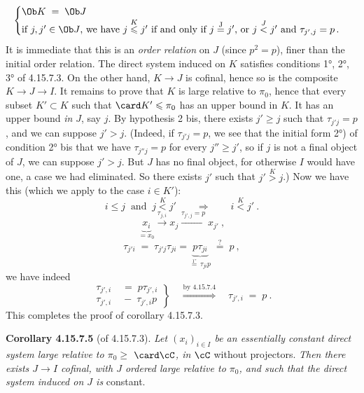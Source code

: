 \[
\begin{cases}
\Ob K \;=\; \Ob J \\
\text{if } j,j' \in \Ob J\text{, we have } j \overset{K}{\leqslant} j' \text{ if and only if } j \overset{\mathrm{J}}{=} j'\text{, or } j \overset{J}{<} j' \text{ and } \tau_{j',j} = p\,.
\end{cases}
\]
It is immediate that this is an \textit{order relation} on $J$ (since $p^2 = p$), finer than the initial order relation. The direct system induced on $K$ satisfies conditions 1°, 2°, 3° of 4.15.7.3. On the other hand, $K \longrightarrow J$ is cofinal, hence so is the composite $K \longrightarrow J \longrightarrow I$. It remains to prove that $K$ is large relative to $\pi_0$, hence that every subset $K' \subset K$ such that $\card K' \leqslant \pi_0$ has an upper bound in $K$. It has an upper bound \textit{in} $J$, say $j$. By hypothesis 2 bis, there exists $j' \geqslant j$ such that $\tau_{j'j} = p$, and we can suppose $j' > j$. (Indeed, if $\tau_{j'j} = p$, we see that
the initial form 2°) of condition 2° bis that we have $\tau_{j''j} = p$ for every $j'' \geqslant j'$, so if $j$ is not a final object of $J$, %
we can suppose $j' > j$. But $J$ has no final object, for otherwise $I$ would have one, a case we had eliminated. So there exists $j'$ such that $j' \overset{K}{>} j$.) Now we have this (which we apply to the case $i \in K'$):
\[
i \leqslant j \ \text{ and } \ j \overset{K}{<} j' \qquad \Longrightarrow \qquad i \overset{K}{<} j'\ .
\]
\[
\underbrace{x_i}_{= x_0} \xrightarrow{\tau_{j,i}} x_j \xrightarrow{\tau_{j',j}=p} x_{j'}\ ,
\]
\[
\tau_{j'i} \;=\; \tau_{j'j}\tau_{ji} = \underbrace{p\tau_{ji}}_{\overset{\text{1°}}{=}\,\tau_{ji}p} \;\overset{?}{=}\; p\ ,
\]
we have indeed
\[
\left.
\begin{aligned}
\tau_{j',i} &\;=\; p\tau_{j',i} \\
\tau_{j',i} &\;-\; \tau_{j',i}p %
\end{aligned}
\right\}
\quad \overset{\text{by 4.15.7.4}}{\Longrightarrow} \quad %
\tau_{j',i} \;=\; p\ .
\]
This completes the proof of corollary 4.15.7.3.

\textbf{Corollary 4.15.7.5} (of 4.15.7.3). \textit{Let $(x_i)_{i\in I}$ be an essentially constant direct system large relative to $\pi_0 \geqslant$} $\card\cC$\textit{, in $\cC$} without projectors. \textit{Then there exists $J \longrightarrow I$ cofinal, with $J$ ordered large relative to $\pi_0$, and such that the direct system induced on $J$ is} constant.


